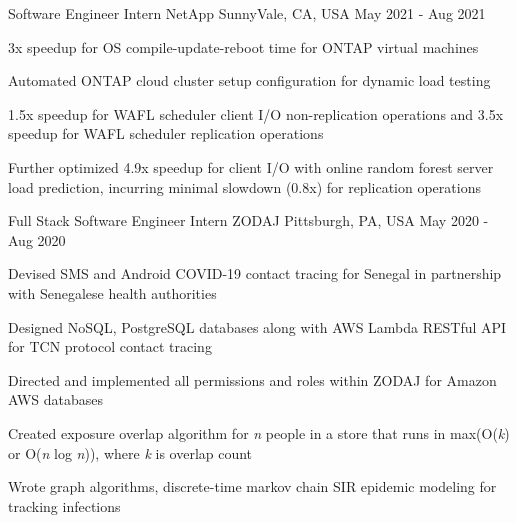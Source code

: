 

\begin{cventries}

  \cventry
    {Software Engineer Intern} %
    {NetApp} %
    {SunnyVale, CA, USA} %
    {May 2021 - Aug 2021} %
    {
      \begin{cvitems} %
        \item {3x speedup for OS compile-update-reboot time for ONTAP virtual machines}
        \item {Automated ONTAP cloud cluster setup configuration for dynamic load testing}
        \item {1.5x speedup for WAFL scheduler client I/O non-replication operations and 3.5x speedup for WAFL scheduler replication operations}
        \item {Further optimized 4.9x speedup for client I/O with online random forest server load prediction, incurring minimal slowdown (0.8x) for replication operations}
      \end{cvitems}
    }

  \cventry
    {Full Stack Software Engineer Intern} %
    {ZODAJ} %
    {Pittsburgh, PA, USA} %
    {May 2020 - Aug 2020} %
    {
      \begin{cvitems} %
        \item {Devised SMS and Android COVID-19 contact tracing for Senegal in partnership with Senegalese health authorities}
        \item {Designed NoSQL, PostgreSQL databases along with AWS Lambda RESTful API for TCN protocol contact tracing}
        \item {Directed and implemented all permissions and roles within ZODAJ for Amazon AWS databases}
        \item {Created exposure overlap algorithm for \textit{n} people in a store that runs in max(O(\textit{k}) or O(\textit{n} log \textit{n})), where \textit{k} is overlap count}
        \item {Wrote graph algorithms, discrete-time markov chain SIR epidemic modeling for tracking infections}
      \end{cvitems}
    }


\end{cventries}
